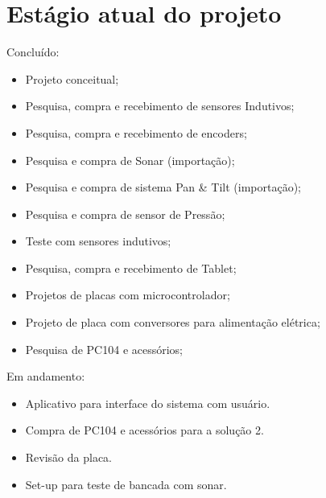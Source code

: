 \section{Estágio atual do projeto}

Concluído:
\begin{itemize}
  \item Projeto conceitual;
  \item Pesquisa, compra e recebimento de sensores Indutivos;
  \item Pesquisa, compra e recebimento de encoders;
  \item Pesquisa e compra de Sonar (importação);
  \item Pesquisa e compra de sistema Pan \& Tilt (importação);
  \item Pesquisa e compra de sensor de Pressão;
  \item Teste com sensores indutivos;
  \item Pesquisa, compra e recebimento de Tablet;
  \item Projetos de placas com microcontrolador;
  \item Projeto de placa com conversores para alimentação elétrica;
  \item Pesquisa de PC104 e acessórios;   
\end{itemize}
Em andamento:
\begin{itemize}
  \item Aplicativo para interface do sistema com usuário.
  \item Compra de PC104 e acessórios para a solução 2.
  \item Revisão da placa.
  \item Set-up para teste de bancada com sonar.
\end{itemize}